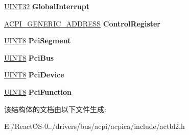 \begin{DoxyCompactItemize}
\item 
\mbox{\label{structacpi__table__mchi_ad5f3d583c84dda8e481afe08914d390b}} 
\hyperlink{_processor_bind_8h_ae1e6edbbc26d6fbc71a90190d0266018}{U\+I\+N\+T32} {\bfseries Global\+Interrupt}
\item 
\mbox{\label{structacpi__table__mchi_ab3de025ab287ebb29ae236fe43b3ac6a}} 
\hyperlink{structacpi__generic__address}{A\+C\+P\+I\+\_\+\+G\+E\+N\+E\+R\+I\+C\+\_\+\+A\+D\+D\+R\+E\+SS} {\bfseries Control\+Register}
\item 
\mbox{\label{structacpi__table__mchi_a864e1712b31d973fdf7078b9ffe02199}} 
\hyperlink{_processor_bind_8h_ab27e9918b538ce9d8ca692479b375b6a}{U\+I\+N\+T8} {\bfseries Pci\+Segment}
\item 
\mbox{\label{structacpi__table__mchi_a45158ab2e06db60e07544b4a62f9d11b}} 
\hyperlink{_processor_bind_8h_ab27e9918b538ce9d8ca692479b375b6a}{U\+I\+N\+T8} {\bfseries Pci\+Bus}
\item 
\mbox{\label{structacpi__table__mchi_a3fbf4eb67a78a6dafceba0bc77d3c703}} 
\hyperlink{_processor_bind_8h_ab27e9918b538ce9d8ca692479b375b6a}{U\+I\+N\+T8} {\bfseries Pci\+Device}
\item 
\mbox{\label{structacpi__table__mchi_a5fff45b275e533ccc86112e163473041}} 
\hyperlink{_processor_bind_8h_ab27e9918b538ce9d8ca692479b375b6a}{U\+I\+N\+T8} {\bfseries Pci\+Function}
\end{DoxyCompactItemize}


该结构体的文档由以下文件生成\+:\begin{DoxyCompactItemize}
\item 
E\+:/\+React\+O\+S-\/0../drivers/bus/acpi/acpica/include/actbl2.\+h\end{DoxyCompactItemize}
